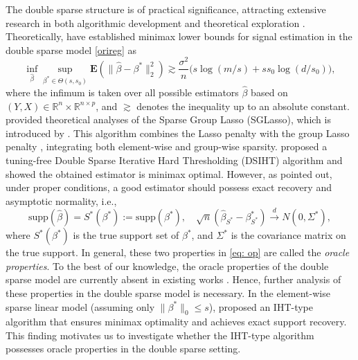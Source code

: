\documentclass[12pt]{article}
\begin{document}
The double sparse structure is of practical significance, attracting extensive research in both algorithmic development \cite{liang2023sparsegl, Breheny15} and theoretical exploration \cite{CZ22, LZ22, LZ23}.
Theoretically, \cite{CZ22, LZ22} have established minimax lower bounds for signal estimation in the double sparse model \eqref{orireg} as 
\begin{equation}\label{eq:gener}
 \inf_{\hat \beta} \sup_{\beta^* \in {\Theta}(s,s_0)} \mathbf E \left( \| \hat \beta - \beta^*\|_2^2 \right) \gtrsim \frac{\sigma^2}n \big( s \log({m}/{s}) + ss_0 \log(d/s_0) \big),
\end{equation}
where the infimum is taken over all possible estimators $\hat \beta$ based on $(Y,X) \in \mathbb R^{n} \times \mathbb R^{n \times p}$, and $\gtrsim $ denotes the inequality up to an absolute constant.
\cite{CZ22, LZ23} provided theoretical analyses of the Sparse Group Lasso (SGLasso), which is introduced by \cite{simon13SGL}. 
This algorithm combines the Lasso penalty \cite{tib96lasso} with the group Lasso penalty \cite{yuan2006model}, integrating both element-wise and group-wise sparsity.
\cite{ZL23} proposed a tuning-free Double Sparse Iterative Hard Thresholding (DSIHT) algorithm and showed the obtained estimator is minimax optimal.
However, as \cite{FanLi01,fan04ncp, Zou01122006} pointed out, under proper conditions, a good estimator should possess exact recovery and asymptotic normality, i.e., 
\begin{equation}\label{eq: op}
\text{supp}(\hat{\beta})=S^*(\beta^*):= \text{supp}(\beta^*),\quad \sqrt n\left( \hat{\beta}_{S^*} - \beta^*_{S^*} \right) \overset{d} \to N(0 , \Sigma^*),
\end{equation}
where $S^*(\beta^*)$ is the true support set of $\beta^*$, and $\Sigma^*$ is the covariance matrix on the true support.
In general, these two properties in \eqref{eq: op} are called the \emph{oracle properties}. To the best of our knowledge, the oracle properties of the double sparse model are currently absent in existing works \cite{CZ22, LZ22, ZL23, LZ23}. Hence, further analysis of these properties in the double sparse model is necessary.
In the element-wise sparse linear model (assuming only $\|\beta^*\|_0 \leq s$), \cite{NM20} proposed an IHT-type algorithm that ensures minimax optimality and achieves exact support recovery.
This finding motivates us to investigate whether the IHT-type algorithm possesses oracle properties in the double sparse setting.
\end{document}
